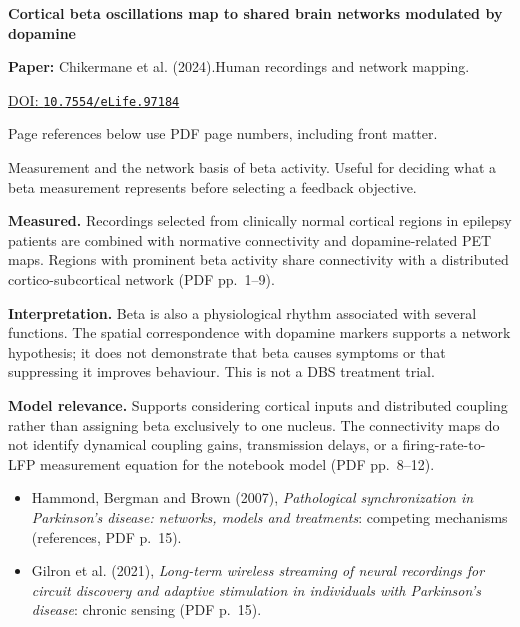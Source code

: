 

{\Large\bfseries Cortical beta oscillations map to shared brain networks modulated by dopamine\par}

\textbf{Paper:} Chikermane et al. (2024).\quad Human recordings and network mapping.\par
\href{https://doi.org/10.7554/eLife.97184}{DOI: \nolinkurl{10.7554/eLife.97184}}\par
{\footnotesize Page references below use PDF page numbers, including front matter.}

Measurement and the network basis of beta activity. Useful for deciding what a beta measurement represents before selecting a feedback objective.

\textbf{Measured.} Recordings selected from clinically normal cortical regions in epilepsy patients are combined with normative connectivity and dopamine-related PET maps. Regions with prominent beta activity share connectivity with a distributed cortico-subcortical network (PDF pp.~1--9).

\textbf{Interpretation.} Beta is also a physiological rhythm associated with several functions. The spatial correspondence with dopamine markers supports a network hypothesis; it does not demonstrate that beta causes symptoms or that suppressing it improves behaviour. This is not a DBS treatment trial.

\textbf{Model relevance.} Supports considering cortical inputs and distributed coupling rather than assigning beta exclusively to one nucleus. The connectivity maps do not identify dynamical coupling gains, transmission delays, or a firing-rate-to-LFP measurement equation for the notebook model (PDF pp.~8--12).

\begin{itemize}
\item Hammond, Bergman and Brown (2007), \emph{Pathological synchronization in Parkinson's disease: networks, models and treatments}: competing mechanisms (references, PDF p.~15).
\item Gilron et al. (2021), \emph{Long-term wireless streaming of neural recordings for circuit discovery and adaptive stimulation in individuals with Parkinson's disease}: chronic sensing (PDF p.~15).
\end{itemize}



